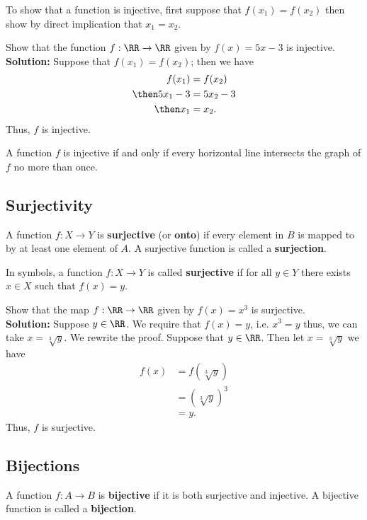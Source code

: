 \documentclass[12pt, a4paper]{article}
\begin{document}
\begin{mdnote}
    To show that a function is injective, first suppose that \(f(x_1)=f(x_2)\) then show by direct implication that \(x_1=x_2\).
\end{mdnote}

\begin{example}
    Show that the function \(f:\RR \to \RR\) given by \(f(x)=5x-3\) is injective. \\
    \textbf{Solution:} Suppose that \(f(x_1)=f(x_2)\); then we have
    \[\begin{aligned}
        f(x_1)&=f(x_2) \\
        \then 5x_1-3&=5x_2-3 \\
        \then x_1 &=x_2.
    \end{aligned}\]
    Thus, \(f\) is injective.
\end{example}
    
\begin{theorem}
    A function $f$ is injective if and only if every horizontal line intersects the graph of $f$ no more than once.
\end{theorem}

\subsection{Surjectivity}

\begin{definition}
    A function $f : X \to Y$ is \textbf{surjective} (or \textbf{onto}) if every element in $B$ is mapped to by at least one element of $A.$ A surjective function is called a \textbf{surjection}. 
    
    In symbols, a function \(f:X \to Y\) is called \textbf{surjective} if for all \(y \in Y\) there exists \(x \in X\) such that \(f(x)=y\).
\end{definition}

\begin{example}
    Show that the map \(f : \RR \to \RR\) given by \(f(x)=x^3\) is surjective. \\
    \textbf{Solution:} Suppose \(y \in \RR\). We require that \(f(x)=y\), i.e. \(x^3=y\) thus, we can take \(x=\sqrt[3]{y}\). We rewrite the proof. Suppose that \(y \in \RR\). Then let \(x=\sqrt[3]{y}\) we have 
    \[\begin{aligned}
        f(x)&=f(\sqrt[3]{y}) \\
        &= (\sqrt[3]{y})^3 \\
        &=y.
    \end{aligned}\]
    Thus, \(f\) is surjective.
\end{example}

\subsection{Bijections}

\begin{definition}
    A function $f : A \to B$ is \textbf{bijective} if it is both surjective and injective. A bijective function is called a \textbf{bijection}.
\end{definition}
\end{document}
